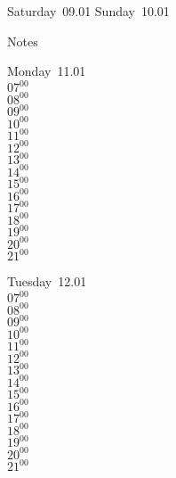 \documentclass[11pt,a4paper]{book}\usepackage[]{graphicx}\usepackage[]{color}
\begin{document}
\begin{weekendbox}
  Saturday~09.01
  \tcblower
  Sunday~10.01
\end{weekendbox} %
\begin{notebox}
  Notes
\end{notebox}
\clearpage
\begin{headerbox}
\end{headerbox}
\begin{weekdaybox}
  Monday~11.01\\
  { 
  \vfill
  $07^{00}$\\
$08^{00}$\\
$09^{00}$\\
$10^{00}$\\
$11^{00}$\\
$12^{00}$\\
$13^{00}$\\
$14^{00}$\\
$15^{00}$\\
$16^{00}$\\
$17^{00}$\\
$18^{00}$\\
$19^{00}$\\
$20^{00}$\\
$21^{00}$\\
  }
\end{weekdaybox}
\begin{weekdaybox}
  Tuesday~12.01\\
  { 
  \vfill
  $07^{00}$\\
$08^{00}$\\
$09^{00}$\\
$10^{00}$\\
$11^{00}$\\
$12^{00}$\\
$13^{00}$\\
$14^{00}$\\
$15^{00}$\\
$16^{00}$\\
$17^{00}$\\
$18^{00}$\\
$19^{00}$\\
$20^{00}$\\
$21^{00}$\\
  }
\end{weekdaybox}
\end{document}
